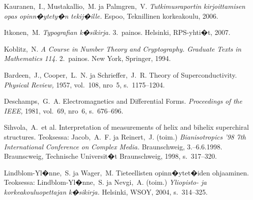 \documentclass[finnish,12pt,a4paper,pdftex]{article}
\begin{document}
\clearpage
\begin{thebibliography}{99}

 Kauranen,\ I., Mustakallio,\ M. ja Palmgren,\ V.
  \textit{Tutkimusraportin kirjoittamisen opas opinn�ytety�n
    tekij�ille.}  Espoo, Teknillinen korkeakoulu, 2006.

 Itkonen,\ M. \textit{Typografian k�sikirja.} 3.\
  painos.  Helsinki, RPS-yhti�t, 2007.

 Koblitz,\ N. \textit{A Course in Number Theory and
    Cryptography. Graduate Texts in Mathematics 114.}  2.\ painos. New
  York, Springer, 1994.

\bibitem{bcs} Bardeen,\ J., Cooper,\ L.\ N. ja Schrieffer,\ J.\ R.
  Theory of Superconductivity. \textit{Physical Review,} 1957, vol.\
  108, nro~5, s.\ 1175--1204.

 Deschamps,\ G.\ A. Electromagnetics and
  Differential Forms. \textit{Proceedings of the IEEE,} 1981, vol.\
  69, nro~6, s.\ 676--696.

\bibitem{Sihvola} Sihvola,\ A.\ et al.
  \foreignlanguage{english}{Interpretation of measurements of helix 
and bihelix superchiral structures.}  Teoksessa: Jacob,\ A.\ F. ja
  Reinert,\ J. (toim.) \textit{Bianisotropics '98 7th International
    Conference on Complex Media.}  Braunschweig, 3.--6.6.1998.
  Braunscweig, Technische Universit�t Braunschweig, 1998, s.\
  317--320.

 Lindblom-Yl�nne,\ S. ja Wager,\ M.  Tieteellisten
  opinn�ytet�iden ohjaaminen. Teoksessa: Lindblom-Yl�nne,\ S. ja
  Nevgi,\ A. (toim.) \textit{Yliopisto- ja korkeakouluopettajan
    k�sikirja.}  Helsinki, WSOY, 2004, s.\ 314--325.
 

\end{thebibliography}
\end{document}
